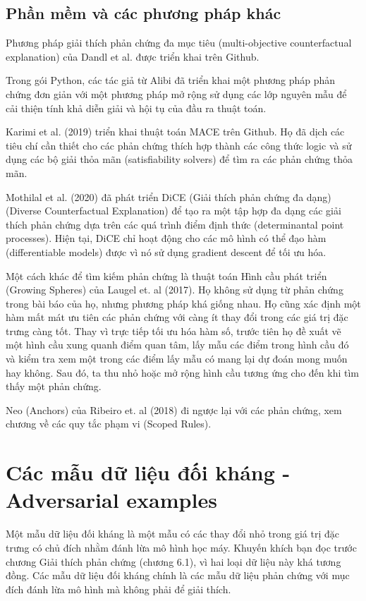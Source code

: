 \subsection{Phần mềm và các phương pháp khác}
Phương pháp giải thích phản chứng đa mục tiêu (multi-objective counterfactual explanation) của Dandl et al. được triển khai trên Github.

Trong gói Python, các tác giả từ Alibi đã triển khai một phương pháp phản chứng đơn giản với một phương pháp mở rộng sử dụng các lớp nguyên mẫu để cải thiện tính khả diễn giải và hội tụ của đầu ra thuật toán.

Karimi et al. (2019) triển khai thuật toán MACE trên Github. Họ đã dịch các tiêu chí cần thiết cho các phản chứng thích hợp thành các công thức logic và sử dụng các bộ giải thỏa mãn (satisfiability solvers) để tìm ra các phản chứng thỏa mãn.

Mothilal et al. (2020) đã phát triển DiCE (Giải thích phản chứng đa dạng) (Diverse Counterfactual Explanation) để tạo ra một tập hợp đa dạng các giải thích phản chứng dựa trên các quá trình điểm định thức (determinantal point processes). Hiện tại, DiCE chỉ hoạt động cho các mô hình có thể đạo hàm (differentiable models) được vì nó sử dụng gradient descent để tối ưu hóa.

Một cách khác để tìm kiếm phản chứng là thuật toán Hình cầu phát triển (Growing Spheres) của Laugel et. al (2017). Họ không sử dụng từ phản chứng trong bài báo của họ, nhưng phương pháp khá giống nhau. Họ cũng xác định một hàm mất mát ưu tiên các phản chứng với càng ít thay đổi trong các giá trị đặc trưng càng tốt. Thay vì trực tiếp tối ưu hóa hàm số, trước tiên họ đề xuất vẽ một hình cầu xung quanh điểm quan tâm, lấy mẫu các điểm trong hình cầu đó và kiểm tra xem một trong các điểm lấy mẫu có mang lại dự đoán mong muốn hay không. Sau đó, ta thu nhỏ hoặc mở rộng hình cầu tương ứng cho đến khi tìm thấy một phản chứng.

Neo (Anchors) của Ribeiro et. al (2018) đi ngược lại với các phản chứng, xem chương về các quy tắc phạm vi (Scoped Rules).

\clearpage

\section{Các mẫu dữ liệu đối kháng - Adversarial examples} 

Một mẫu dữ liệu đối kháng là một mẫu có các thay đổi nhỏ trong giá trị đặc trưng có chủ đích nhằm đánh lừa mô hình học máy. Khuyến khích bạn đọc trước chương Giải thích phản chứng (chương 6.1), vì hai loại dữ liệu này khá tương đồng. Các mẫu dữ liệu đối kháng chính là các mẫu dữ liệu phản chứng với mục đích đánh lừa mô hình mà không phải để giải thích.

